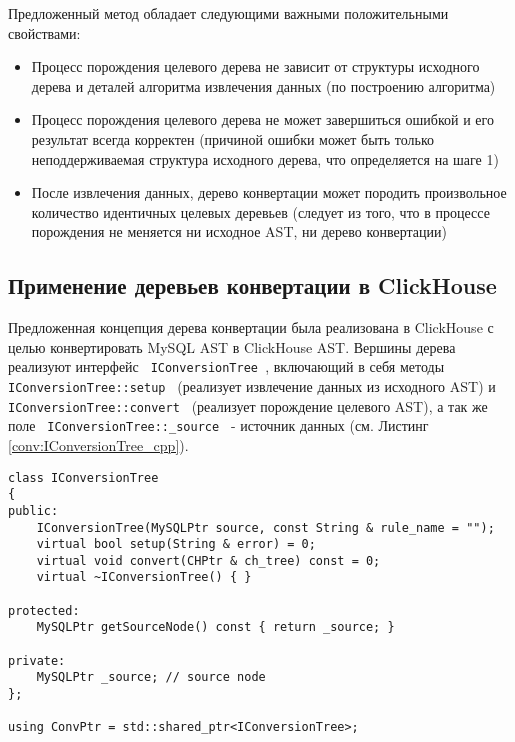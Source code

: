 Предложенный метод обладает следующими важными положительными свойствами:
\begin{itemize}
    \item Процесс порождения целевого дерева не зависит от структуры исходного дерева и деталей алгоритма извлечения данных (по построению алгоритма)
    \item Процесс порождения целевого дерева не может завершиться ошибкой и его результат всегда корректен (причиной ошибки может быть только неподдерживаемая структура исходного дерева, что определяется на шаге 1)
    \item После извлечения данных, дерево конвертации может породить произвольное количество идентичных целевых деревьев (следует из того, что в процессе порождения не меняется ни исходное AST, ни дерево конвертации)
\end{itemize}

\subsection{Применение деревьев конвертации в ClickHouse}
Предложенная концепция дерева конвертации была реализована в ClickHouse с целью конвертировать MySQL AST в ClickHouse AST. Вершины дерева реализуют интерфейс \texttt{ IConversionTree }, включающий в себя методы \texttt{ IConversionTree::setup } (реализует извлечение данных из исходного AST) и \texttt{ IConversionTree::convert } (реализует порождение целевого AST), а так же поле \texttt{ IConversionTree::_source } - источник данных (см. Листинг \ref{conv:IConversionTree_cpp}).

\begin{code}
    \label{conv:IConversionTree_cpp}
    \begin{verbatim}
class IConversionTree
{
public:
    IConversionTree(MySQLPtr source, const String & rule_name = "");
    virtual bool setup(String & error) = 0;
    virtual void convert(CHPtr & ch_tree) const = 0;
    virtual ~IConversionTree() { }

protected:
    MySQLPtr getSourceNode() const { return _source; }

private:
    MySQLPtr _source; // source node
};

using ConvPtr = std::shared_ptr<IConversionTree>;
    \end{verbatim}
\end{code}

